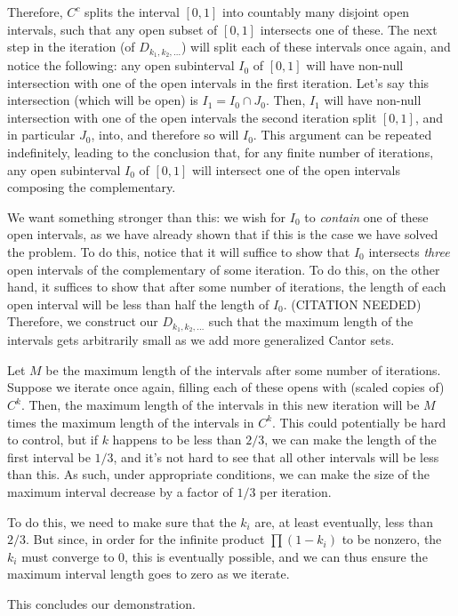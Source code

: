 \documentclass{article}
\begin{document}
	Therefore, $C^c$ splits the interval $[0,1]$ into countably many disjoint open intervals, such that any open subset of $[0,1]$ intersects one of these. The next step in the iteration (of $D_{k_1, k_2, \ldots}$) will split each of these intervals once again, and notice the following: any open subinterval $I_0$ of $[0,1]$ will have non-null intersection with one of the open intervals in the first iteration. Let's say this intersection (which will be open) is $I_1 = I_0 \cap J_0$. Then, $I_1$ will have non-null intersection with one of the open intervals the second iteration split $[0,1]$, and in particular $J_0$, into, and therefore so will $I_0$. This argument can be repeated indefinitely, leading to the conclusion that, for any finite number of iterations, any open subinterval $I_0$ of $[0,1]$ will intersect one of the open intervals composing the complementary.
	
	We want something stronger than this: we wish for $I_0$ to \emph{contain} one of these open intervals, as we have already shown that if this is the case we have solved the problem. To do this, notice that it will suffice to show that $I_0$ intersects \emph{three} open intervals of the complementary of some iteration. To do this, on the other hand, it suffices to show that after some number of iterations, the length of each open interval will be less than half the length of $I_0$. (CITATION NEEDED) Therefore, we construct our $D_{k_1, k_2, \ldots}$ such that the maximum length of the intervals gets arbitrarily small as we add more generalized Cantor sets.
	
	Let $M$ be the maximum length of the intervals after some number of iterations. Suppose we iterate once again, filling each of these opens with (scaled copies of) $C^k$. Then, the maximum length of the intervals in this new iteration will be $M$ times the maximum length of the intervals in $C^k$. This could potentially be hard to control, but if $k$ happens to be less than $2/3$, we can make the length of the first interval be $1/3$, and it's not hard to see that all other intervals will be less than this. As such, under appropriate conditions, we can make the size of the maximum interval decrease by a factor of $1/3$ per iteration.
	
	To do this, we need to make sure that the $k_i$ are, at least eventually, less than $2/3$. But since, in order for the infinite product $\prod (1 - k_i)$ to be nonzero, the $k_i$ must converge to 0, this is eventually possible, and we can thus ensure the maximum interval length goes to zero as we iterate.
	
	This concludes our demonstration.
\end{document}
